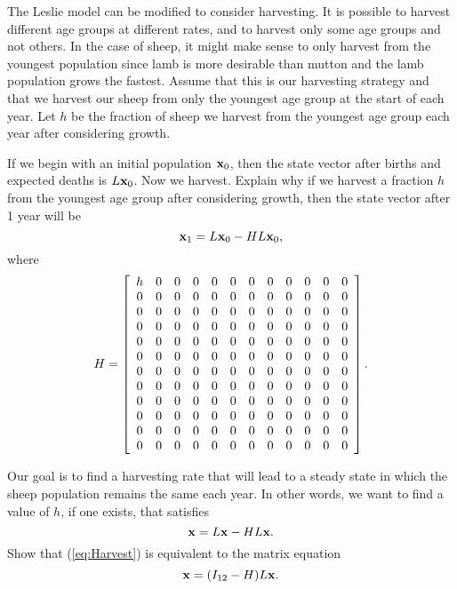 \begin{pactivity} \label{act:Leslie_harvest} The Leslie model can be modified to consider harvesting. It is possible to harvest different age groups at different rates, and to harvest only some age groups and not others. In the case of sheep, it might make sense to only harvest from the youngest population since lamb is more desirable than mutton and the lamb population grows the fastest. Assume that this is our harvesting strategy and that we harvest our sheep from only the youngest age group at the start of each year. Let $h$ be the fraction of sheep we harvest from the youngest age group each year after considering growth.
\ba
\item If we begin with an initial population $\mathbf{x}_0$, then the state vector after births and expected deaths is $L\mathbf{x}_0$. Now we harvest. Explain why if we harvest a fraction $h$ from the youngest age group after considering growth, then the state vector after 1 year will be
\begin{equation*}
\mathbf{x}_1 = L\mathbf{x}_0 - HL\mathbf{x}_0,
\end{equation*}
where
\[H =  \left[
\begin{array}{c c c c c c c c c c c c}
h    	& 0 	& 0 	& 0 	& 0 	& 0 	& 0 	& 0	 	& 0 	& 0 	& 0 	& 0 \\
0 		& 0 	& 0 	& 0 	& 0 	& 0 	& 0 	& 0 	& 0 	& 0 	& 0 	& 0 \\
0 		& 0 	& 0		& 0 	& 0 	& 0 	& 0 	& 0 	& 0 	& 0 	& 0 	& 0 \\
0 		& 0 	& 0		& 0 	& 0 	& 0 	& 0 	& 0 	& 0 	& 0 	& 0 	& 0 \\
0 		& 0 	& 0		& 0		& 0 	& 0 	& 0 	& 0 	& 0 	& 0 	& 0 	& 0 \\
0 		& 0 	& 0		& 0		& 0 	& 0 	& 0 	& 0 	& 0 	& 0 	& 0 	& 0 \\
0 		& 0 	& 0		& 0		& 0 	& 0		& 0 	& 0 	& 0 	& 0 	& 0 	& 0 \\
0 		& 0 	& 0		& 0		& 0 	& 0		& 0		& 0 	& 0 	& 0 	& 0 	& 0 \\
0 		& 0 	& 0		& 0		& 0 	& 0		& 0		& 0		& 0 	& 0 	& 0 	& 0 \\
0 		& 0 	& 0		& 0		& 0 	& 0		& 0		& 0		& 0		& 0 	& 0 	& 0 \\
0 		& 0 	& 0		& 0		& 0 	& 0		& 0		& 0		& 0		& 0		& 0 	& 0 \\
0 		& 0 	& 0		& 0		& 0 	& 0		& 0		& 0		& 0		& 0		& 0		& 0 \\
\end{array} \right].\]


\item Our goal is to find a harvesting rate that will lead to a steady state in which the sheep population remains the same each year. In other words, we want to find a value of $h$, if one exists, that satisfies
\begin{equation}
\mathbf{x} = L\mathbf{x} - HL\mathbf{x}. \label{eq:Harvest}
\end{equation}
Show that (\ref{eq:Harvest}) is equivalent to the matrix equation
\begin{equation}
\mathbf{x} = (I_{12}-H)L\mathbf{x}. \label{eq:Harvest2}
\end{equation}


\end{pactivity}
